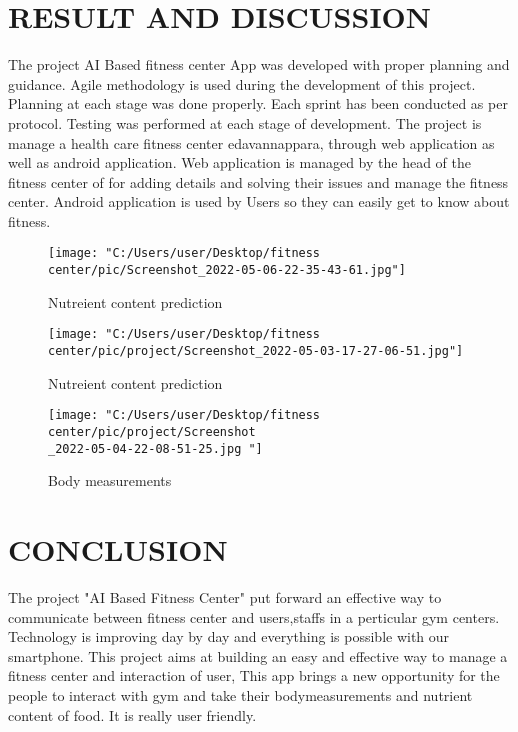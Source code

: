 \documentclass[a4paper,12pt,toc=flat]{report}
\begin{document}
{{	\chapter{RESULT AND DISCUSSION}
	
	
	The project AI Based fitness center App was developed with proper planning and guidance. Agile methodology is used during the development of this project. Planning at each stage was done properly. Each sprint has been conducted as per protocol. Testing was performed at each stage of development. The project is  manage a health care fitness center edavannappara, through web application as well as android application.
	Web application is managed by the head of the fitness center of for adding details and solving their issues and manage the fitness center. Android application is used by Users so they can easily get to know about fitness.
\begin{figure}[!ht]
	\begin{minipage}{0.4\linewidth}
		\texttt{[image: "C:/Users/user/Desktop/fitness center/pic/Screenshot\_2022-05-06-22-35-43-61.jpg"]}
		\caption{Nutreient content prediction}
	\end{minipage}
	\hfill
	\begin{minipage}{0.4\linewidth}
		\texttt{[image: "C:/Users/user/Desktop/fitness center/pic/project/Screenshot\_2022-05-03-17-27-06-51.jpg"]}
		\caption{Nutreient content prediction }
	\end{minipage}
	\end{figure}
		\begin{figure}[!ht]
			\begin{minipage}{0.4\linewidth}
				\texttt{[image: "C:/Users/user/Desktop/fitness center/pic/project/Screenshot\\\_2022-05-04-22-08-51-25.jpg	"]}
				\caption{Body measurements}
			\end{minipage}
		
	
	
\end{figure}
	\newpage

	
	\chapter{CONCLUSION}
	
	
	The project "AI Based Fitness Center" put forward an effective way to communicate between fitness center and users,staffs in a perticular gym centers. Technology is improving day by day and everything is possible with our smartphone. This project aims at building an easy and effective way to manage a fitness center and interaction of user, This app brings a new opportunity for the people to interact with gym and take their bodymeasurements and nutrient content of food. It is really user friendly.
	
}}
\end{document}
